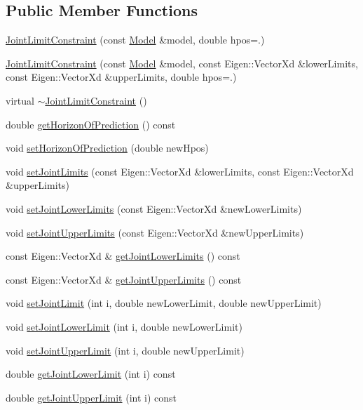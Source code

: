 \subsection*{Public Member Functions}
\begin{DoxyCompactItemize}
\item 
\hyperlink{classocra_1_1JointLimitConstraint_af81ce81f8c90e5bf4272cc6ab592ae69}{Joint\+Limit\+Constraint} (const \hyperlink{classocra_1_1Model}{Model} \&model, double hpos=.)
\item 
\hyperlink{classocra_1_1JointLimitConstraint_a8e767f982c1d41192b03a0aafbd3ced5}{Joint\+Limit\+Constraint} (const \hyperlink{classocra_1_1Model}{Model} \&model, const Eigen\+::\+Vector\+Xd \&lower\+Limits, const Eigen\+::\+Vector\+Xd \&upper\+Limits, double hpos=.)
\item 
virtual \hyperlink{classocra_1_1JointLimitConstraint_a5cb58e4dd8fe8c313a50e8601306e0dd}{$\sim$\+Joint\+Limit\+Constraint} ()
\item 
double \hyperlink{classocra_1_1JointLimitConstraint_a41760d380bf624499e815224dce351e8}{get\+Horizon\+Of\+Prediction} () const 
\item 
void \hyperlink{classocra_1_1JointLimitConstraint_a6903c0e8ea1024dd050b604e741634a6}{set\+Horizon\+Of\+Prediction} (double new\+Hpos)
\item 
void \hyperlink{classocra_1_1JointLimitConstraint_ab2dcfcc6420510ddc291dbae83e38c40}{set\+Joint\+Limits} (const Eigen\+::\+Vector\+Xd \&lower\+Limits, const Eigen\+::\+Vector\+Xd \&upper\+Limits)
\item 
void \hyperlink{classocra_1_1JointLimitConstraint_a1ef49a88ac2646a45bac289a9b623b8f}{set\+Joint\+Lower\+Limits} (const Eigen\+::\+Vector\+Xd \&new\+Lower\+Limits)
\item 
void \hyperlink{classocra_1_1JointLimitConstraint_ad019e751fdb343ea0bd29efab8f4d5d2}{set\+Joint\+Upper\+Limits} (const Eigen\+::\+Vector\+Xd \&new\+Upper\+Limits)
\item 
const Eigen\+::\+Vector\+Xd \& \hyperlink{classocra_1_1JointLimitConstraint_a2e038e5ba992a8efed5423ddab370d28}{get\+Joint\+Lower\+Limits} () const 
\item 
const Eigen\+::\+Vector\+Xd \& \hyperlink{classocra_1_1JointLimitConstraint_ae445b3ed33110f66e1e75df928b1a4ef}{get\+Joint\+Upper\+Limits} () const 
\item 
void \hyperlink{classocra_1_1JointLimitConstraint_a774667152d3cd376ef3101a4db889c3f}{set\+Joint\+Limit} (int i, double new\+Lower\+Limit, double new\+Upper\+Limit)
\item 
void \hyperlink{classocra_1_1JointLimitConstraint_abeac7915f147b24c8afd43ba44ce000c}{set\+Joint\+Lower\+Limit} (int i, double new\+Lower\+Limit)
\item 
void \hyperlink{classocra_1_1JointLimitConstraint_a4dd11a29e4ba9655efa588292335559d}{set\+Joint\+Upper\+Limit} (int i, double new\+Upper\+Limit)
\item 
double \hyperlink{classocra_1_1JointLimitConstraint_a930259343033d05911ab2a0c1744858f}{get\+Joint\+Lower\+Limit} (int i) const 
\item 
double \hyperlink{classocra_1_1JointLimitConstraint_add6aca1ebba9dd13f21d90df6647d834}{get\+Joint\+Upper\+Limit} (int i) const 
\end{DoxyCompactItemize}
